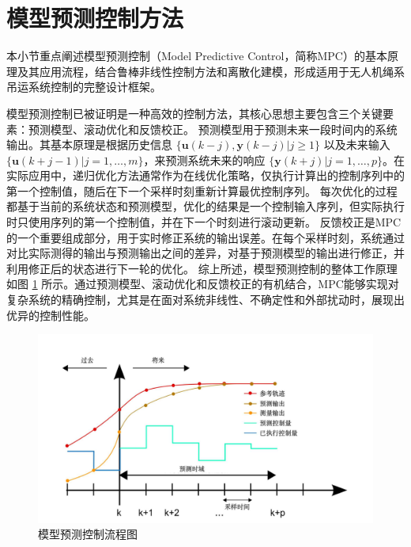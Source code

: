 \documentclass[lang=chs, degree=master, blindreview=true, winfonts=true]{yanputhesis}
\begin{document}



\section{模型预测控制方法}
本小节重点阐述模型预测控制（Model Predictive Control，简称MPC）的基本原理及其应用流程，结合鲁棒非线性控制方法和离散化建模，形成适用于无人机绳系吊运系统控制的完整设计框架。

模型预测控制已被证明是一种高效的控制方法\cite{2003A}，其核心思想主要包含三个关键要素：预测模型、滚动优化和反馈校正。
预测模型用于预测未来一段时间内的系统输出。其基本原理是根据历史信息 $\{ \bm u(k-j), \bm y(k-j) | j \geq 1 \}$ 以及未来输入 $\{ \bm u(k+j-1) | j = 1, \dots, m \}$，来预测系统未来的响应 $\{ \bm y(k+j) | j = 1, \dots, p \}$。在实际应用中，递归优化方法通常作为在线优化策略，仅执行计算出的控制序列中的第一个控制值，随后在下一个采样时刻重新计算最优控制序列。
每次优化的过程都基于当前的系统状态和预测模型，优化的结果是一个控制输入序列，但实际执行时只使用序列的第一个控制值，并在下一个时刻进行滚动更新。
反馈校正是MPC的一个重要组成部分，用于实时修正系统的输出误差。在每个采样时刻，系统通过对比实际测得的输出与预测输出之间的差异，对基于预测模型的输出进行修正，并利用修正后的状态进行下一轮的优化。
综上所述，模型预测控制的整体工作原理如图 \ref{mpc} 所示。通过预测模型、滚动优化和反馈校正的有机结合，MPC能够实现对复杂系统的精确控制，尤其是在面对系统非线性、不确定性和外部扰动时，展现出优异的控制性能。

\begin{figure}[hbt!]
	\centering
	\includegraphics[width=40pc]{picture/mpc.jpg} 
	\caption{模型预测控制流程图} \label{mpc}
\end{figure}
\end{document}
